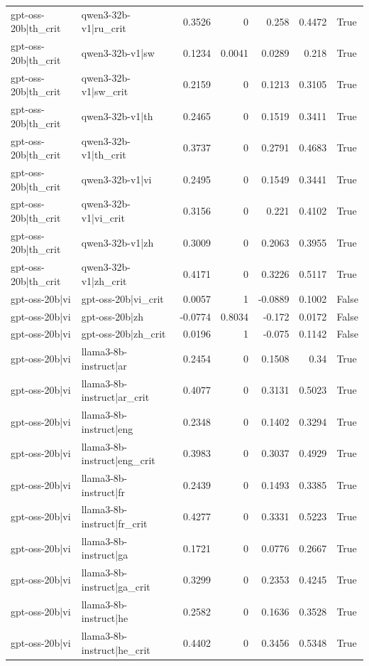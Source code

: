 \begin{table}
\begin{tabular}{l l r r r r l}
gpt-oss-20b|th_crit & qwen3-32b-v1|ru_crit & 0.3526 & 0 & 0.258 & 0.4472 & True \\
gpt-oss-20b|th_crit & qwen3-32b-v1|sw & 0.1234 & 0.0041 & 0.0289 & 0.218 & True \\
gpt-oss-20b|th_crit & qwen3-32b-v1|sw_crit & 0.2159 & 0 & 0.1213 & 0.3105 & True \\
gpt-oss-20b|th_crit & qwen3-32b-v1|th & 0.2465 & 0 & 0.1519 & 0.3411 & True \\
gpt-oss-20b|th_crit & qwen3-32b-v1|th_crit & 0.3737 & 0 & 0.2791 & 0.4683 & True \\
gpt-oss-20b|th_crit & qwen3-32b-v1|vi & 0.2495 & 0 & 0.1549 & 0.3441 & True \\
gpt-oss-20b|th_crit & qwen3-32b-v1|vi_crit & 0.3156 & 0 & 0.221 & 0.4102 & True \\
gpt-oss-20b|th_crit & qwen3-32b-v1|zh & 0.3009 & 0 & 0.2063 & 0.3955 & True \\
gpt-oss-20b|th_crit & qwen3-32b-v1|zh_crit & 0.4171 & 0 & 0.3226 & 0.5117 & True \\
gpt-oss-20b|vi & gpt-oss-20b|vi_crit & 0.0057 & 1 & -0.0889 & 0.1002 & False \\
gpt-oss-20b|vi & gpt-oss-20b|zh & -0.0774 & 0.8034 & -0.172 & 0.0172 & False \\
gpt-oss-20b|vi & gpt-oss-20b|zh_crit & 0.0196 & 1 & -0.075 & 0.1142 & False \\
gpt-oss-20b|vi & llama3-8b-instruct|ar & 0.2454 & 0 & 0.1508 & 0.34 & True \\
gpt-oss-20b|vi & llama3-8b-instruct|ar_crit & 0.4077 & 0 & 0.3131 & 0.5023 & True \\
gpt-oss-20b|vi & llama3-8b-instruct|eng & 0.2348 & 0 & 0.1402 & 0.3294 & True \\
gpt-oss-20b|vi & llama3-8b-instruct|eng_crit & 0.3983 & 0 & 0.3037 & 0.4929 & True \\
gpt-oss-20b|vi & llama3-8b-instruct|fr & 0.2439 & 0 & 0.1493 & 0.3385 & True \\
gpt-oss-20b|vi & llama3-8b-instruct|fr_crit & 0.4277 & 0 & 0.3331 & 0.5223 & True \\
gpt-oss-20b|vi & llama3-8b-instruct|ga & 0.1721 & 0 & 0.0776 & 0.2667 & True \\
gpt-oss-20b|vi & llama3-8b-instruct|ga_crit & 0.3299 & 0 & 0.2353 & 0.4245 & True \\
gpt-oss-20b|vi & llama3-8b-instruct|he & 0.2582 & 0 & 0.1636 & 0.3528 & True \\
gpt-oss-20b|vi & llama3-8b-instruct|he_crit & 0.4402 & 0 & 0.3456 & 0.5348 & True \\

\end{tabular}
\end{table}
